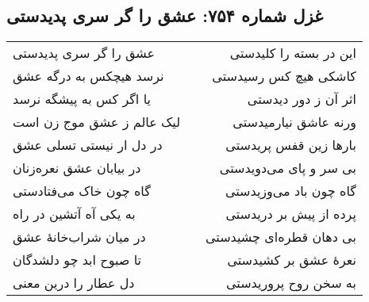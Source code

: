\begin{center}
\section*{غزل شماره ۷۵۴: عشق را گر سری پدیدستی}
\label{sec:754}
\begin{longtable}{l p{0.5cm} r}
عشق را گر سری پدیدستی
&&
این در بسته را کلیدستی
\\
نرسد هیچکس به درگه عشق
&&
کاشکی هیچ کس رسیدستی
\\
یا اگر کس به پیشگه نرسد
&&
اثر آن ز دور دیدستی
\\
لیک عالم ز عشق موج زن است
&&
ورنه عاشق نیارمیدستی
\\
در دل ار نیستی تسلی عشق
&&
بارها زین قفس پریدستی
\\
در بیابان عشق نعره‌زنان
&&
بی سر و پای می‌دویدستی
\\
گاه چون خاک می‌فتادستی
&&
گاه چون باد می‌وزیدستی
\\
به یکی آه آتشین در راه
&&
پرده از پیش بر دریدستی
\\
در میان شراب‌خانهٔ عشق
&&
بی دهان قطره‌ای چشیدستی
\\
تا صبوح ابد چو دلشدگان
&&
نعرهٔ عشق بر کشیدستی
\\
دل عطار را درین معنی
&&
به سخن روح پروریدستی
\\
\end{longtable}
\end{center}

